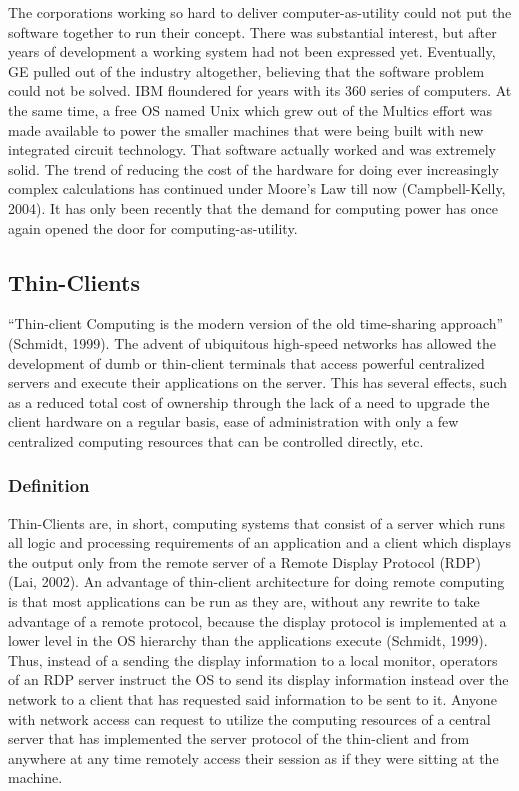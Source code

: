 \documentclass[12pt,oneside,letterpaper]{article}
\begin{document}
The corporations working so hard to deliver computer-as-utility could not put
the software together to run their concept.  There was substantial interest, but
after years of development a working system had not been expressed yet.
Eventually, GE pulled out of the industry altogether, believing that the
software problem could not be solved.  IBM floundered for years with its 360
series of computers.  At the same time, a free OS named Unix which grew out of
the Multics effort was made available to power the smaller machines that were
being built with new integrated circuit technology.  That software actually
worked and was extremely solid.  The trend of reducing the cost of the hardware
for doing ever increasingly complex calculations has continued under Moore's Law
till now (Campbell-Kelly, 2004).  It has only been recently that the demand for
computing power has once again opened the door for computing-as-utility.

\subsection{Thin-Clients}

``Thin-client Computing is the modern version of the old time-sharing approach''
(Schmidt, 1999).  The advent of ubiquitous high-speed networks has allowed the
development of dumb or thin-client terminals that access powerful centralized
servers and execute their applications on the server.  This has several effects,
such as a reduced total cost of ownership through the lack of a need to upgrade
the client hardware on a regular basis, ease of administration with only a few
centralized computing resources that can be controlled directly, etc.

\subsubsection{Definition}

Thin-Clients are, in short, computing systems that consist of a server which
runs all logic and processing requirements of an application and a client which
displays the output only from the remote server of a Remote Display Protocol
(RDP) (Lai, 2002).  An advantage of thin-client architecture for doing remote
computing is that most applications can be run as they are, without any rewrite
to take advantage of a remote protocol, because the display protocol is
implemented at a lower level in the OS hierarchy than the applications execute
(Schmidt, 1999).  Thus, instead of a sending the display information to a local
monitor, operators of an RDP server instruct the OS to send its display
information instead over the network to a client that has requested said
information to be sent to it.  Anyone with network access can request to utilize
the computing resources of a central server that has implemented the server
protocol of the thin-client and from anywhere at any time remotely access their
session as if they were sitting at the machine.
\end{document}
